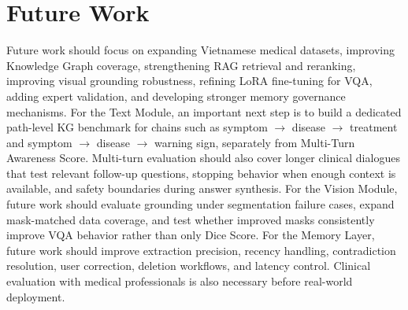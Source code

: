 \section{Future Work}

Future work should focus on expanding Vietnamese medical datasets, improving Knowledge Graph coverage, strengthening RAG retrieval and reranking, improving visual grounding robustness, refining LoRA fine-tuning for VQA, adding expert validation, and developing stronger memory governance mechanisms. For the Text Module, an important next step is to build a dedicated path-level KG benchmark for chains such as symptom $\rightarrow$ disease $\rightarrow$ treatment and symptom $\rightarrow$ disease $\rightarrow$ warning sign, separately from Multi-Turn Awareness Score. Multi-turn evaluation should also cover longer clinical dialogues that test relevant follow-up questions, stopping behavior when enough context is available, and safety boundaries during answer synthesis. For the Vision Module, future work should evaluate grounding under segmentation failure cases, expand mask-matched data coverage, and test whether improved masks consistently improve VQA behavior rather than only Dice Score. For the Memory Layer, future work should improve extraction precision, recency handling, contradiction resolution, user correction, deletion workflows, and latency control. Clinical evaluation with medical professionals is also necessary before real-world deployment.

